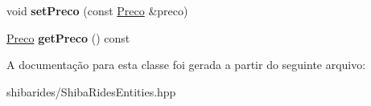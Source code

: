 \begin{DoxyCompactItemize}
\item 
void {\bfseries set\+Preco} (const \hyperlink{classshibarides_1_1Preco}{Preco} \&preco)\hypertarget{classshibarides_1_1Carona_a6db9b66a554694539c5f5aa4f13657a1}{}\label{classshibarides_1_1Carona_a6db9b66a554694539c5f5aa4f13657a1}

\item 
\hyperlink{classshibarides_1_1Preco}{Preco} {\bfseries get\+Preco} () const \hypertarget{classshibarides_1_1Carona_a8ec9d24a04fe95497976b985ec7c6c04}{}\label{classshibarides_1_1Carona_a8ec9d24a04fe95497976b985ec7c6c04}

\end{DoxyCompactItemize}


A documentação para esta classe foi gerada a partir do seguinte arquivo\+:\begin{DoxyCompactItemize}
\item 
shibarides/Shiba\+Rides\+Entities.\+hpp\end{DoxyCompactItemize}
